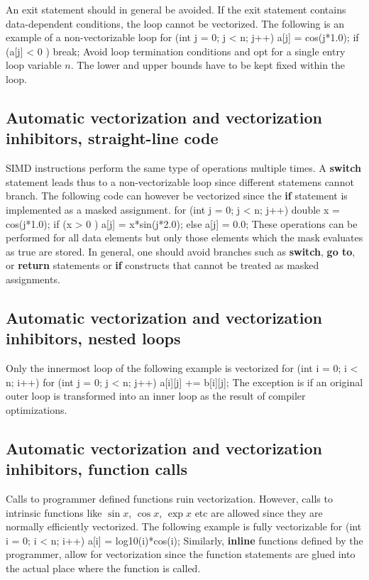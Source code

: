 \documentclass[%
oneside,                 %
final,                   %
10pt]{article}
\begin{document}
An exit statement should in general be avoided. 
If the exit statement contains data-dependent conditions, the loop cannot be vectorized. 
The following is an example of a non-vectorizable loop
\bcppcod
  for (int j = 0; j < n; j++) {
    a[j] = cos(j*1.0);
    if (a[j] < 0 ) break;
  }
\ecppcod
Avoid loop termination conditions and opt for a single entry loop variable $n$. The lower and upper bounds have to be kept fixed within the loop. 

\subsection{Automatic vectorization and vectorization inhibitors, straight-line code}

SIMD instructions perform the same type of operations multiple times. 
A \textbf{switch} statement leads thus to a non-vectorizable loop since different statemens cannot branch.
The following code can however be vectorized since the \textbf{if} statement is implemented as a masked assignment.
\bcppcod
  for (int j = 0; j < n; j++) {
    double x  = cos(j*1.0);
    if (x > 0 ) {
       a[j] =  x*sin(j*2.0); 
    }
    else {
       a[j] = 0.0;
    }
  }
\ecppcod
These operations can be performed for all data elements but only those elements which the mask evaluates as true are stored. In general, one should avoid branches such as \textbf{switch}, \textbf{go to}, or \textbf{return} statements or \textbf{if} constructs that cannot be treated as masked assignments. 


\subsection{Automatic vectorization and vectorization inhibitors, nested loops}

Only the innermost loop of the following example is vectorized
\bcppcod
  for (int i = 0; i < n; i++) {
      for (int j = 0; j < n; j++) {
           a[i][j] += b[i][j];
      }  
  }
\ecppcod
The exception is if an original outer loop is transformed into an inner loop as the result of compiler optimizations.


\subsection{Automatic vectorization and vectorization inhibitors, function calls}

Calls to programmer defined functions ruin vectorization. However, calls to intrinsic functions like
$\sin{x}$, $\cos{x}$, $\exp{x}$ etc are allowed since they are normally efficiently vectorized. 
The following example is fully vectorizable
\bcppcod
  for (int i = 0; i < n; i++) {
      a[i] = log10(i)*cos(i);
  }
\ecppcod
Similarly, \textbf{inline} functions defined by the programmer, allow for vectorization since the function statements are glued into the actual place where the function is called. 
\end{document}
